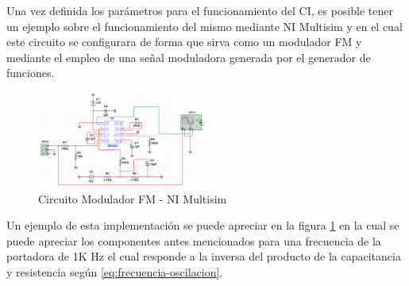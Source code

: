 \documentclass[conference]{IEEEtran}
\begin{document}
	Una vez definida los parámetros para el funcionamiento del CI, es posible tener un ejemplo sobre el funcionamiento del mismo mediante NI Multisim y en el cual este circuito se configurara de forma que sirva como un modulador FM y mediante el empleo de una señal moduladora generada por el generador de funciones.
	
	\begin{figure}[h]
		\centering
		\includegraphics[width=0.5\textwidth]{media/simulacion-xr2206}
		\caption{Circuito Modulador FM - NI Multisim}
		\label{fig:simulacion-xr2206}
	\end{figure}
	
	Un ejemplo de esta implementación se puede apreciar en la figura \ref{fig:simulacion-xr2206} en la cual se puede apreciar los componentes antes mencionados para una frecuencia de la portadora de 1K Hz el cual responde a la inversa del producto de la capacitancia y resistencia según \ref{eq:frecuencia-oscilacion}.
	
	
	
	
	
	
	
	
	
	
	
	
	
	
	
	
	
	
	
	
	
	
	
	
	
	
	
	
	
\end{document}
